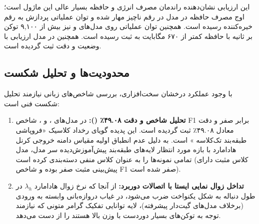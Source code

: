این ارزیابی نشان‌دهنده راندمان مصرف انرژی و حافظه بسیار عالی این ماژول است؛ اوج مصرف حافظه در مدل  در رقم ناچیز  مهار شده و توان عملیاتی پردازش به رقم خیره‌کننده  رسیده است. همچنین توان عملیاتی روی مدل‌های  و  نیز بیش از ۹,۱۰۰ توکن بر ثانیه با حافظه کمتر از ۶۷۰ مگابایت به ثبت رسیده است. همچنین در مدل  ارزیابی با وضعیت  و دقت  ثبت گردیده است.

\subsection{محدودیت‌ها و تحلیل شکست}
با وجود عملکرد درخشان سخت‌افزاری، بررسی شاخص‌های زبانی نیازمند تحلیل شکست فنی است:
\begin{enumerate}
    \item \textbf{تحلیل شاخص  و دقت ۴۹.۰۸٪ ():} در مدل‌های ،  و ، شاخص F1 برابر صفر و دقت معادل ۴۹.۰۸٪ ثبت گردیده است. این پدیده گویای رخداد کلاسیک «فروپاشی طبقه‌بند تک‌کلاسه » است. به دلیل عدم انطباق اولیه مقیاس دامنه خروجی کرنل هادامارد با بازه مورد انتظار لایه‌های طبقه‌بند پیش‌آموزش‌دیده سر مدل، مدل تمامی نمونه‌ها را به عنوان کلاس منفی دسته‌بندی کرده است (کلاس مثبت دارای پیش‌بینی مثبت صفر بوده و شاخص F1 صفر شده است).
    \item \textbf{تداخل زوال نمایی ایستا با اتصالات دوربرد:} از آنجا که نرخ زوال هادامارد $\lambda_h$ در طول دنباله به شکل یکنواخت ضرب می‌شود، در غیاب دروازه‌بانی وابسته به ورودی (برخلاف مدل‌های گیت‌دار پیشرفته)، لایه توانایی تفکیک گرامر متونی که نیازمند توجه به توکن‌های بسیار دوردست با وزن بالا هستند را از دست می‌دهد.
\end{enumerate}
